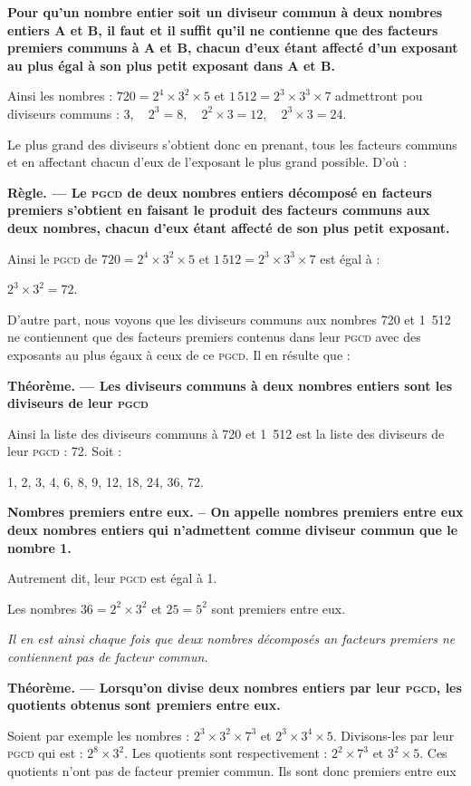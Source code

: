 \textbf{Pour qu'un nombre entier soit un diviseur commun à deux nombres entiers A et B, il faut et il suffit qu'il ne contienne que des facteurs premiers communs à  A et B, chacun d'eux étant affecté d'un exposant au plus égal à son plus petit exposant dans A et B.}

 Ainsi les nombres : $720 = 2^4 \times 3^2 \times 5$  et $1\,512 = 2^3 \times 3^3 \times  7 $ admettront pou diviseurs communs : $3,\quad  2^3=8, \quad 2^2\times 3=12, \quad 2^3 \times 3=24$. 

Le plus grand des diviseurs s'obtient donc en prenant, tous  les facteurs communs et en affectant chacun d'eux de l'exposant le plus grand possible. D'où : 


\textbf{Règle. — Le \textsc{pgcd} de deux nombres entiers décomposé en facteurs premiers s'obtient en faisant le produit des facteurs communs aux deux nombres, chacun d'eux étant affecté de son plus petit exposant.}

Ainsi le \textsc{pgcd} de $720 = 2^4 \times 3^2 \times 5$  et $1\,512 = 2^3 \times 3^3 \times 7$ est égal à : 

\smallskip 

\centerline {$2^3 \times 3^2 = 72$.}

D'autre part, nous voyons que les diviseurs communs aux nombres 720 et 1~512 ne contiennent que des facteurs premiers contenus dans leur \textsc{pgcd} avec des exposants au plus égaux à ceux de ce \textsc{pgcd}. Il en résulte que : 

\textbf{Théorème. — Les diviseurs communs à deux nombres entiers sont les diviseurs de leur \textsc{pgcd}} \label{Diviseur_du_pgcd}

Ainsi la liste des diviseurs communs à 720 et 1~512 est la liste des diviseurs de leur \textsc{pgcd} : 72. Soit : 

\centerline{1, 2, 3, 4, 6, 8, 9, 12, 18, 24, 36, 72.}

\textbf{ Nombres premiers entre eux. -- On appelle nombres premiers entre eux deux nombres entiers qui n'admettent comme diviseur commun que le nombre 1.}

Autrement dit, leur \textsc{pgcd} est égal à 1. 

Les nombres $36 = 2^2 \times 3^2$ et $25 = 5^2$ sont premiers entre eux. 

\textit{Il en est ainsi chaque fois que deux nombres décomposés an facteurs premiers ne contiennent pas de facteur commun.}
 
\textbf{Théorème. — Lorsqu'on divise deux nombres entiers par leur  \textsc{pgcd}, les quotients obtenus sont premiers entre eux.}

 Soient par exemple les nombres : $2^3 \times 3^2 \times 7^3$ et $2^3 \times 3^4 \times 5$. Divisons-les par leur  \textsc{pgcd} qui est : $2^8 \times 3^2$. Les quotients sont respectivement : $2^2 \times 7^3$ et $3^2 \times 5$. Ces quotients n'ont pas de facteur premier commun. Ils sont donc premiers entre eux 






